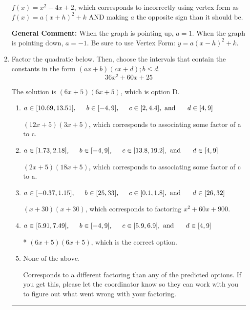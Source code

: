 \documentclass{extbook}[14pt]
\newcommand{\litem}[1]{\item #1

\rule{\textwidth}{0.4pt}}
\begin{document}
\begin{enumerate}
{\begin{enumerate}[label=\Alph*.]
$f(x)=x^{2} -4 x + 2$, which corresponds to incorrectly using vertex form as $f(x) = a(x+h)^2+k$ AND making $a$ the opposite sign than it should be.
\end{enumerate}

\textbf{General Comment:} When the graph is pointing up, $a=1$. When the graph is pointing down, $a=-1$. Be sure to use Vertex Form: $y = a(x-h)^2+k$.
}
\litem{
Factor the quadratic below. Then, choose the intervals that contain the constants in the form $(ax+b)(cx+d); b \leq d.$
\[ 36x^{2} +60 x + 25 \]

The solution is \( (6x + 5)(6x + 5) \), which is option D.\begin{enumerate}[label=\Alph*.]
\item \( a \in [10.69, 13.51], \hspace*{5mm} b \in [-4, 9], \hspace*{5mm} c \in [2, 4.4], \text{ and } \hspace*{5mm} d \in [4, 9] \)

 $(12x + 5)(3x + 5)$, which corresponds to associating some factor of a to c.
\item \( a \in [1.73, 2.18], \hspace*{5mm} b \in [-4, 9], \hspace*{5mm} c \in [13.8, 19.2], \text{ and } \hspace*{5mm} d \in [4, 9] \)

 $(2x + 5)(18x + 5)$, which corresponds to associating some factor of c to a.
\item \( a \in [-0.37, 1.15], \hspace*{5mm} b \in [25, 33], \hspace*{5mm} c \in [0.1, 1.8], \text{ and } \hspace*{5mm} d \in [26, 32] \)

 $(x + 30)(x + 30)$, which corresponds to factoring $x^{2} +60 x + 900$.
\item \( a \in [5.91, 7.49], \hspace*{5mm} b \in [-4, 9], \hspace*{5mm} c \in [5.9, 6.9], \text{ and } \hspace*{5mm} d \in [4, 9] \)

* $(6x + 5)(6x + 5)$, which is the correct option.
\item \( \text{None of the above.} \)

 Corresponds to a different factoring than any of the predicted options. If you get this, please let the coordinator know so they can work with you to figure out what went wrong with your factoring.
\end{enumerate}

}
\end{enumerate}
\end{document}
